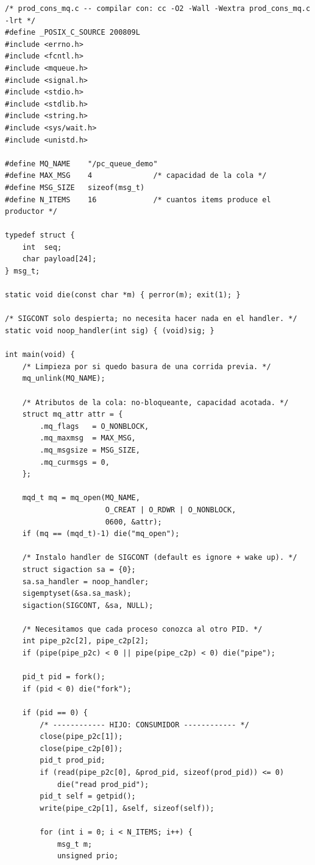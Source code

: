 \documentclass[11pt,a4paper]{article}
\begin{document}
\begin{lstlisting}[style=cstyle]
/* prod_cons_mq.c -- compilar con: cc -O2 -Wall -Wextra prod_cons_mq.c -lrt */
#define _POSIX_C_SOURCE 200809L
#include <errno.h>
#include <fcntl.h>
#include <mqueue.h>
#include <signal.h>
#include <stdio.h>
#include <stdlib.h>
#include <string.h>
#include <sys/wait.h>
#include <unistd.h>

#define MQ_NAME    "/pc_queue_demo"
#define MAX_MSG    4              /* capacidad de la cola */
#define MSG_SIZE   sizeof(msg_t)
#define N_ITEMS    16             /* cuantos items produce el productor */

typedef struct {
    int  seq;
    char payload[24];
} msg_t;

static void die(const char *m) { perror(m); exit(1); }

/* SIGCONT solo despierta; no necesita hacer nada en el handler. */
static void noop_handler(int sig) { (void)sig; }

int main(void) {
    /* Limpieza por si quedo basura de una corrida previa. */
    mq_unlink(MQ_NAME);

    /* Atributos de la cola: no-bloqueante, capacidad acotada. */
    struct mq_attr attr = {
        .mq_flags   = O_NONBLOCK,
        .mq_maxmsg  = MAX_MSG,
        .mq_msgsize = MSG_SIZE,
        .mq_curmsgs = 0,
    };

    mqd_t mq = mq_open(MQ_NAME,
                       O_CREAT | O_RDWR | O_NONBLOCK,
                       0600, &attr);
    if (mq == (mqd_t)-1) die("mq_open");

    /* Instalo handler de SIGCONT (default es ignore + wake up). */
    struct sigaction sa = {0};
    sa.sa_handler = noop_handler;
    sigemptyset(&sa.sa_mask);
    sigaction(SIGCONT, &sa, NULL);

    /* Necesitamos que cada proceso conozca al otro PID. */
    int pipe_p2c[2], pipe_c2p[2];
    if (pipe(pipe_p2c) < 0 || pipe(pipe_c2p) < 0) die("pipe");

    pid_t pid = fork();
    if (pid < 0) die("fork");

    if (pid == 0) {
        /* ------------ HIJO: CONSUMIDOR ------------ */
        close(pipe_p2c[1]);
        close(pipe_c2p[0]);
        pid_t prod_pid;
        if (read(pipe_p2c[0], &prod_pid, sizeof(prod_pid)) <= 0)
            die("read prod_pid");
        pid_t self = getpid();
        write(pipe_c2p[1], &self, sizeof(self));

        for (int i = 0; i < N_ITEMS; i++) {
            msg_t m;
            unsigned prio;


\end{lstlisting}
\end{document}
